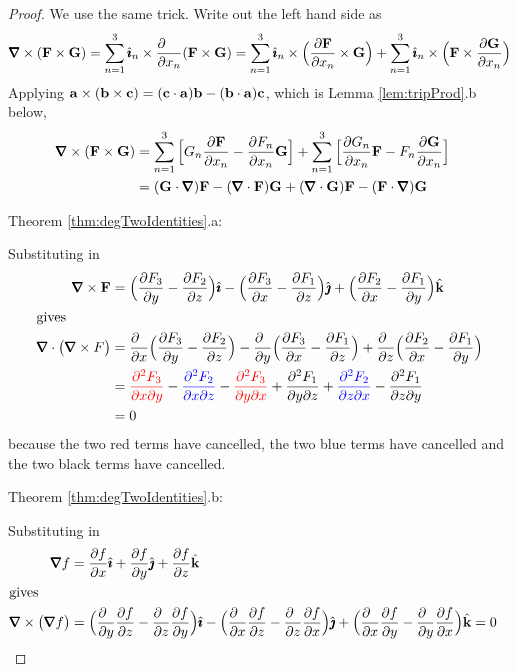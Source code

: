 \begin{proof}
We use the same trick. Write out the left hand side as
\begin{align*}
\vnabla\times(\vF\times\vG)
=\sum_{n=1}^3\hi_n\times\frac{\partial\hfill}{\partial x_n}(\vF\times\vG)
=\sum_{n=1}^3\hi_n\times\Big(\frac{\partial\vF}{\partial x_n}\times\vG\Big)
+\sum_{n=1}^3\hi_n\times\Big(\vF\times\frac{\partial\vG}{\partial x_n}\Big)
\end{align*}
Applying $\mathbf{a}\times(\mathbf{b}\times\mathbf{c})=(\mathbf{c}\cdot\mathbf{a})\mathbf{b}-(\mathbf{b}\cdot\mathbf{a})\mathbf{c}$,
which is Lemma \ref{lem:tripProd}.b below,
\begin{align*}
\vnabla\times(\vF\times\vG)&=
\sum_{n=1}^3\Big[G_n\frac{\partial \vF}{\partial x_n}
-\frac{\partial F_n}{\partial x_n}\vG\Big]
+\sum_{n=1}^3\Big[\frac{\partial G_n}{\partial x_n}\vF
-F_n\frac{\partial \vG}{\partial x_n}\Big]\cr
&=(\vG\cdot\vnabla)\vF -(\vnabla\cdot\vF)\vG+(\vnabla\cdot\vG)\vF
-(\vF\cdot\vnabla)\vG
\end{align*}

\bigskip
\noindent Theorem \ref{thm:degTwoIdentities}.a:

Substituting in 
\begin{align*}
\vnabla\times\vF
&=\Big(\frac{\partial F_3}{\partial y}
-\frac{\partial F_2}{\partial z}\Big)\hi
-\Big(\frac{\partial F_3}{\partial x}
-\frac{\partial F_1}{\partial z}\Big)\hj
+\Big(\frac{\partial F_2}{\partial x}
-\frac{\partial F_1}{\partial y}\Big)\hk\\
\intertext{gives}
\vnabla\cdot\big(\vnabla\times F\big)
&=\frac{\partial\hfill}{\partial x}\Big(\frac{\partial F_3}{\partial y}
-\frac{\partial F_2}{\partial z}\Big)
-\frac{\partial\hfill}{\partial y}\Big(\frac{\partial F_3}{\partial x}
-\frac{\partial F_1}{\partial z}\Big)
+\frac{\partial\hfill}{\partial z}\Big(\frac{\partial F_2}{\partial x}
-\frac{\partial F_1}{\partial y}\Big)\cr
&=\textcolor{red}{\frac{\partial^2 F_3}{\partial x\partial y}}
-\textcolor{blue}{\frac{\partial^2 F_2}{\partial x\partial z}}
-\textcolor{red}{\frac{\partial^2 F_3}{\partial y\partial x}}
+\frac{\partial^2 F_1}{\partial y\partial z}
+\textcolor{blue}{\frac{\partial^2 F_2}{\partial z\partial x}}
-\frac{\partial^2 F_1}{\partial z\partial y} \\
&=0
\end{align*}
because the two red terms have cancelled, the two blue terms have
cancelled and the two black terms have cancelled.



\bigskip
\noindent Theorem \ref{thm:degTwoIdentities}.b:

 Substituting in 
\begin{align*}
\vnabla f
&=\frac{\partial f}{\partial x}\hi
+\frac{\partial f}{\partial y}\hj
+\frac{\partial f}{\partial z}\hk\cr
\intertext{gives}
\vnabla\times\big(\vnabla f\big)
&=\Big(\frac{\partial\hfill}{\partial y}\frac{\partial f}{\partial z}
-\frac{\partial\hfill}{\partial z}\frac{\partial f}{\partial y}\Big)
\hi
-\Big(\frac{\partial\hfill}{\partial x}\frac{\partial f}{\partial z}
-\frac{\partial\hfill}{\partial z}\frac{\partial f}{\partial x}\Big)
\hj
+\Big(\frac{\partial\hfill}{\partial x}\frac{\partial f}{\partial y}
-\frac{\partial\hfill}{\partial y}\frac{\partial f}{\partial x}\Big)
\hk
=0
\end{align*}



\end{proof}
